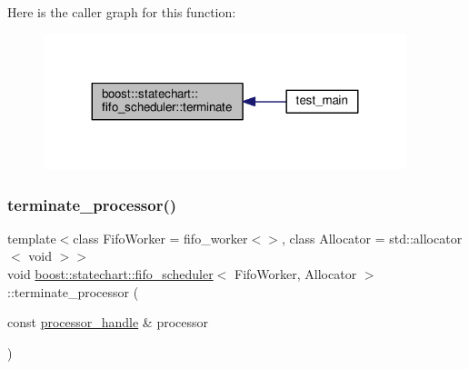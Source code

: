 Here is the caller graph for this function\+:
\nopagebreak
\begin{figure}[H]
\begin{center}
\leavevmode
\includegraphics[width=299pt]{classboost_1_1statechart_1_1fifo__scheduler_ad8b581c6bc8bee838633b5ed9562b996_icgraph}
\end{center}
\end{figure}
\mbox{\label{classboost_1_1statechart_1_1fifo__scheduler_a15b81ce74a62a078dd447acfafbf275c}} 
\subsubsection{\texorpdfstring{terminate\+\_\+processor()}{terminate\_processor()}}
{\footnotesize\ttfamily template$<$class Fifo\+Worker = fifo\+\_\+worker$<$$>$, class Allocator = std\+::allocator$<$ void $>$$>$ \\
void \mbox{\hyperlink{classboost_1_1statechart_1_1fifo__scheduler}{boost\+::statechart\+::fifo\+\_\+scheduler}}$<$ Fifo\+Worker, Allocator $>$\+::terminate\+\_\+processor (\begin{DoxyParamCaption}\item[{const \mbox{\hyperlink{classboost_1_1statechart_1_1fifo__scheduler_ada526939c16c4f8118bc4d7bbf09ad7d}{processor\+\_\+handle}} \&}]{processor }\end{DoxyParamCaption})\hspace{0.3cm}{\ttfamily [inline]}}

\mbox{\label{classboost_1_1statechart_1_1fifo__scheduler_a231ad7f0d511dcc9be86270a9ace50bd}} 
